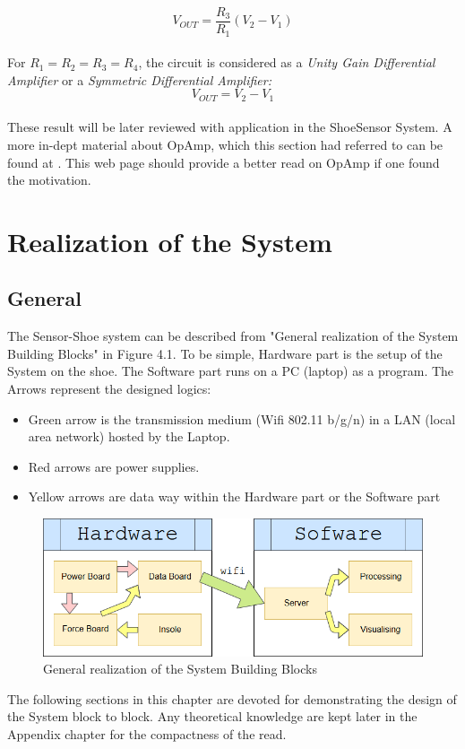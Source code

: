 \documentclass[12 pt, a4paper]{thesis}
\begin{document}
\begin{equation}
V_{OUT}=\frac{R_3}{R_1}(V_2-V_1)
\end{equation}
\\For $R_1=R_2=R_3=R_4$, the circuit is considered as a \textit{Unity Gain Differential Amplifier} or a \textit{Symmetric Differential Amplifier:}
\begin{equation}
V_{OUT} = V_2-V_1
\end{equation}
\\These result will be later reviewed with application in the ShoeSensor System. A more in-dept material about OpAmp, which this section had referred to can be found at \cite{ETut}. This web page should provide a better read on OpAmp if one found the motivation. 
\chapter{Realization of the System}
\section{General}
The Sensor-Shoe system can be described from "General realization of the System Building Blocks" in Figure 4.1. To be simple, Hardware part is the setup of the System on the shoe. The Software part runs on a PC (laptop) as a program. The Arrows represent the designed logics: 
\begin{itemize}
\item {Green arrow is the transmission medium (Wifi 802.11 b/g/n) in a LAN (local area network) hosted by the Laptop.}
\item{Red arrows are power supplies.}
\item{Yellow arrows are data way within the Hardware part or the Software part}
\end{itemize}

\begin{figure}[ht]	
\begin{center}
\includegraphics[width = 150mm]{ROTS_General.png}
\caption{General realization of the System Building Blocks}
\end{center}
\end{figure}
The following sections in this chapter are devoted for demonstrating the design of the System block to block. Any theoretical knowledge are kept later in the Appendix chapter for the compactness of the read.
\pagebreak
\end{document}

